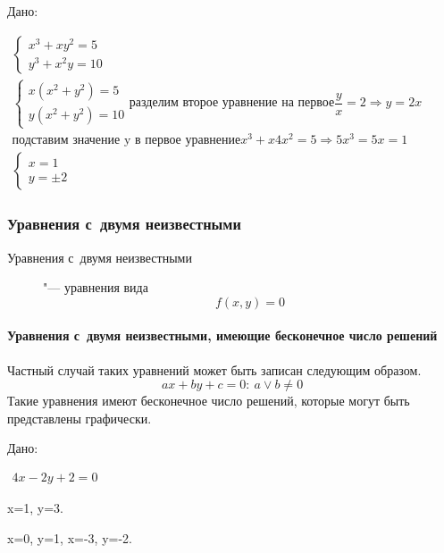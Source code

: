 \documentclass[]{scrartcl}
\begin{document}
\begin{Thexmpl}\label{ex:sys4}
	Дано:
	
	${\displaystyle
		\begin{aligned}
		\begin{cases}
		x^3+xy^2=5\\
		y^3+x^{2}y=10
		\end{cases}\\
		\begin{cases}
		x(x^2+y^2)=5\\
		y(x^2+y^2)=10
		\end{cases}
		\text{разделим второе уравнение на~первое}
		\dfrac{y}{x}=2
		\Rightarrow
		y=2x\\
		\text{подставим значение y в~первое уравнение}
		x^3+x4x^2=5
		\Rightarrow
		5x^3=5
		x=1\\
		\begin{cases}
		x=1\\
		y=\pm2
		\end{cases}  
		\end{aligned}}$
\end{Thexmpl}

\subsubsection{Уравнения с~двумя неизвестными}\label{Two-unknown-1}
\begin{description}
	\item[Уравнения с~двумя неизвестными] "--- уравнения вида
	\begin{equation}\label{eq:two-unknown-1}
	f(x,y)=0
	\end{equation}
\end{description}
\paragraph{Уравнения с~двумя неизвестными, имеющие бесконечное число решений}
Частный случай таких уравнений может быть записан следующим образом.
\begin{equation}\label{eq:two-unknown-2}
ax+by+c=0:\ a \vee b \neq 0
\end{equation}
Такие уравнения имеют бесконечное число решений, которые могут быть представлены графически.

\begin{Thexmpl}\label{ex:two-unknown-1}
	Дано:
	
	$\begin{aligned}
	4x-2y+2=0
	\end{aligned}$
	
	 x=1, y=3.
	
	 x=0, y=1, x=-3, y=-2. 
		
\end{Thexmpl}
\end{document}
